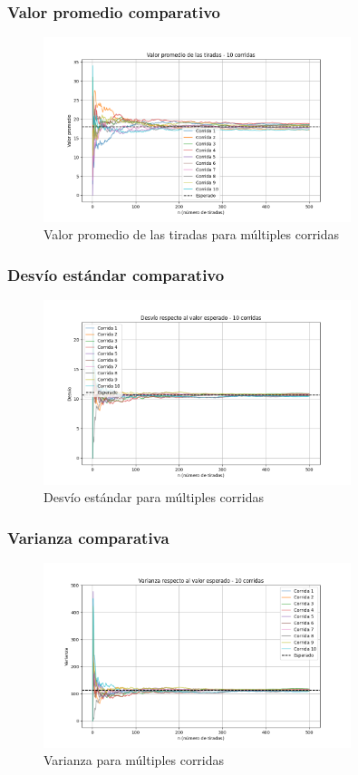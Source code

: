 \documentclass{article}
\begin{document}
\subsubsection{Valor promedio comparativo}
\begin{figure}
  \centering
  \includegraphics[width=0.8\textwidth]{grafica_promedio_todas.png}
  \caption{Valor promedio de las tiradas para múltiples corridas}
  \label{fig:promedio}
\end{figure}

\subsubsection{Desvío estándar comparativo}
\begin{figure}
  \centering
  \includegraphics[width=0.8\textwidth]{grafica_desvio_todas.png}
  \caption{Desvío estándar para múltiples corridas}
  \label{fig:desvio}
\end{figure}

\subsubsection{Varianza comparativa}
\begin{figure}
  \centering
  \includegraphics[width=0.8\textwidth]{grafica_varianza_todas.png}
  \caption{Varianza para múltiples corridas}
  \label{fig:varianza}
\end{figure}
\end{document}
